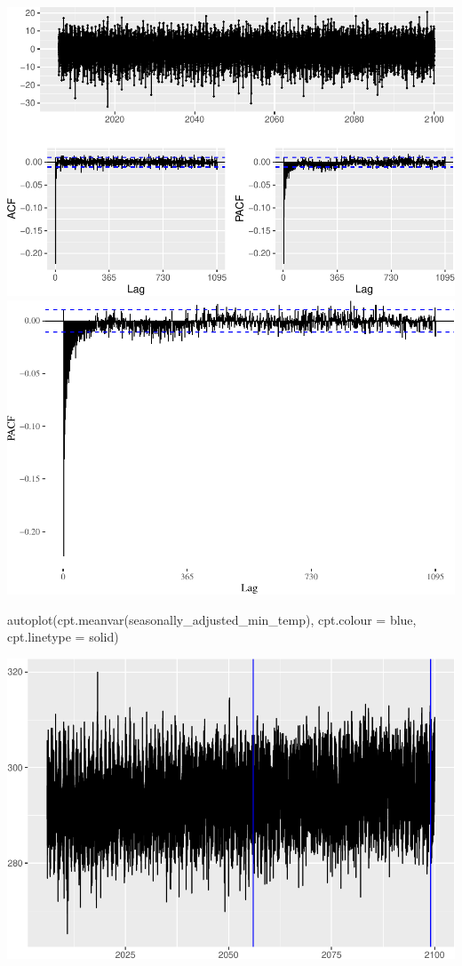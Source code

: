 \documentclass[
  paper=a4,
  ,captions=tableheading
]{scrartcl}
\newenvironment{Shaded}{\begin{snugshade}}{\end{snugshade}}
\newcommand{\AttributeTok}[1]{\textcolor[rgb]{0.77,0.63,0.00}{#1}}
\newcommand{\FunctionTok}[1]{\textcolor[rgb]{0.00,0.00,0.00}{#1}}
\newcommand{\NormalTok}[1]{#1}
\newcommand{\StringTok}[1]{\textcolor[rgb]{0.31,0.60,0.02}{#1}}
\begin{document}
\includegraphics{Haskell_files/figure-latex/unnamed-chunk-62-1.pdf}
\includegraphics{Haskell_files/figure-latex/unnamed-chunk-62-2.pdf}

\begin{Shaded}
\begin{Highlighting}[]
\FunctionTok{autoplot}\NormalTok{(}\FunctionTok{cpt.meanvar}\NormalTok{(seasonally\_adjusted\_min\_temp), }\AttributeTok{cpt.colour =} \StringTok{\textquotesingle{}blue\textquotesingle{}}\NormalTok{, }\AttributeTok{cpt.linetype =} \StringTok{\textquotesingle{}solid\textquotesingle{}}\NormalTok{)}
\end{Highlighting}
\end{Shaded}

\includegraphics{Haskell_files/figure-latex/unnamed-chunk-63-1.pdf}
\end{document}
